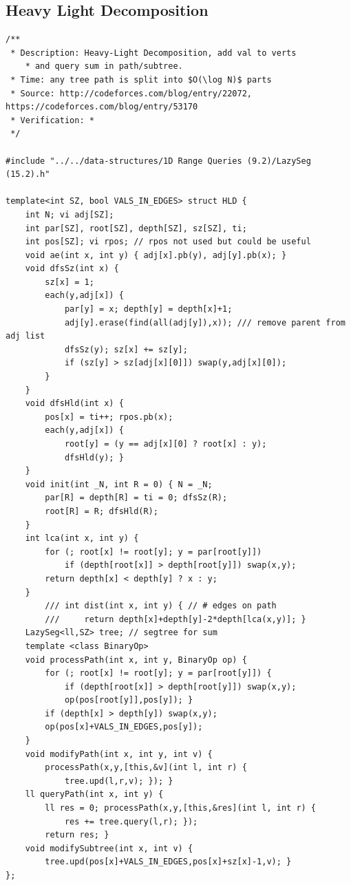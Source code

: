 \documentclass[11pt, a4paper, twoside]{article}
\begin{document}
\subsection{Heavy Light Decomposition}
\begin{verbatim}
/**
 * Description: Heavy-Light Decomposition, add val to verts 
 	* and query sum in path/subtree.
 * Time: any tree path is split into $O(\log N)$ parts
 * Source: http://codeforces.com/blog/entry/22072, https://codeforces.com/blog/entry/53170
 * Verification: *
 */

#include "../../data-structures/1D Range Queries (9.2)/LazySeg (15.2).h"

template<int SZ, bool VALS_IN_EDGES> struct HLD { 
	int N; vi adj[SZ];
	int par[SZ], root[SZ], depth[SZ], sz[SZ], ti;
	int pos[SZ]; vi rpos; // rpos not used but could be useful
	void ae(int x, int y) { adj[x].pb(y), adj[y].pb(x); }
	void dfsSz(int x) { 
		sz[x] = 1; 
		each(y,adj[x]) {
			par[y] = x; depth[y] = depth[x]+1;
			adj[y].erase(find(all(adj[y]),x)); /// remove parent from adj list
			dfsSz(y); sz[x] += sz[y];
			if (sz[y] > sz[adj[x][0]]) swap(y,adj[x][0]);
		}
	}
	void dfsHld(int x) {
		pos[x] = ti++; rpos.pb(x);
		each(y,adj[x]) {
			root[y] = (y == adj[x][0] ? root[x] : y);
			dfsHld(y); }
	}
	void init(int _N, int R = 0) { N = _N; 
		par[R] = depth[R] = ti = 0; dfsSz(R); 
		root[R] = R; dfsHld(R); 
	}
	int lca(int x, int y) {
		for (; root[x] != root[y]; y = par[root[y]])
			if (depth[root[x]] > depth[root[y]]) swap(x,y);
		return depth[x] < depth[y] ? x : y;
	}
    	/// int dist(int x, int y) { // # edges on path
    	/// 	return depth[x]+depth[y]-2*depth[lca(x,y)]; }
	LazySeg<ll,SZ> tree; // segtree for sum
	template <class BinaryOp>
	void processPath(int x, int y, BinaryOp op) {
		for (; root[x] != root[y]; y = par[root[y]]) {
			if (depth[root[x]] > depth[root[y]]) swap(x,y);
			op(pos[root[y]],pos[y]); }
		if (depth[x] > depth[y]) swap(x,y);
		op(pos[x]+VALS_IN_EDGES,pos[y]); 
	}
	void modifyPath(int x, int y, int v) { 
		processPath(x,y,[this,&v](int l, int r) { 
			tree.upd(l,r,v); }); }
	ll queryPath(int x, int y) { 
		ll res = 0; processPath(x,y,[this,&res](int l, int r) { 
			res += tree.query(l,r); });
		return res; }
	void modifySubtree(int x, int v) { 
		tree.upd(pos[x]+VALS_IN_EDGES,pos[x]+sz[x]-1,v); }
};
\end{verbatim}
\end{document}
